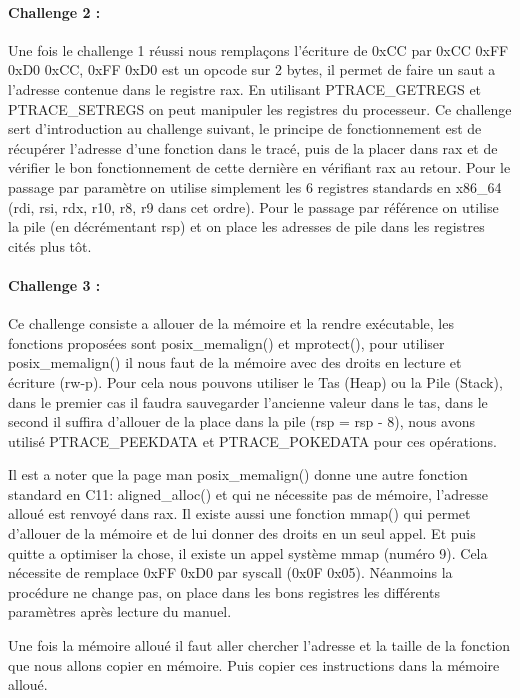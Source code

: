 \documentclass[12pt]{article}
\begin{document}
\paragraph{Challenge 2 :}

Une fois le challenge 1 réussi nous remplaçons l'écriture de 0xCC par 0xCC 0xFF 0xD0 0xCC, 0xFF 0xD0 est un opcode sur 2 bytes,
il permet de faire un saut a l'adresse contenue dans le registre rax.
En utilisant PTRACE\_GETREGS et PTRACE\_SETREGS on peut manipuler les registres du processeur.
Ce challenge sert d'introduction au challenge suivant, le principe de fonctionnement est de récupérer l'adresse d'une fonction dans le tracé,
puis de la placer dans rax et de vérifier le bon fonctionnement de cette dernière en vérifiant rax au retour.
Pour le passage par paramètre on utilise simplement les 6 registres standards en x86\_64 (rdi, rsi, rdx, r10, r8, r9 dans cet ordre). 
Pour le passage par référence on utilise la pile (en décrémentant rsp) et on place les adresses de pile dans les registres cités plus tôt.

\paragraph{Challenge 3 :}

Ce challenge consiste a allouer de la mémoire et la rendre exécutable, les fonctions proposées sont posix\_memalign()
et mprotect(), pour utiliser posix\_memalign() il nous faut de la mémoire avec des droits en lecture et écriture (rw-p).
Pour cela nous pouvons utiliser le Tas (Heap) ou la Pile (Stack), dans le premier cas il faudra sauvegarder l'ancienne valeur dans le tas,
dans le second il suffira d'allouer de la place dans la pile (rsp = rsp - 8), nous avons utilisé PTRACE\_PEEKDATA et
PTRACE\_POKEDATA pour ces opérations.

Il est a noter que la page man posix\_memalign() donne une autre fonction standard en C11: aligned\_alloc() et qui ne nécessite pas de mémoire, l'adresse alloué est renvoyé dans rax.
Il existe aussi une fonction mmap() qui permet d'allouer de la mémoire et de lui donner des droits en un seul appel.
Et puis quitte a optimiser la chose, il existe un appel système mmap (numéro 9).
Cela nécessite de remplace 0xFF 0xD0 par syscall (0x0F 0x05).
Néanmoins la procédure ne change pas, on place dans les bons registres les différents paramètres après lecture du manuel.

Une fois la mémoire alloué il faut aller chercher l'adresse et la taille de la fonction que nous allons copier en mémoire.
Puis copier ces instructions dans la mémoire alloué.
\end{document}
